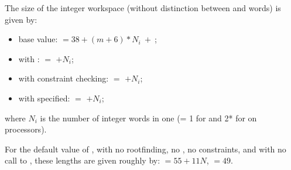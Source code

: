 {{  The size of the integer workspace (without distinction between 
  and  words) is given by:
  \begin{itemize}
  \item base value:  $= 38 + (m + 6)*N_i ~ + ~ $;
  \item with :  $=$  $+ N_i$;
  \item with constraint checking:  $=$  $+ N_i$;
  \item with  specified:  $=$  $+ N_i$;
  \end{itemize}
  where $N_i$ is the number of integer words in one 
  (= 1 for {\nvecs} and 2* for {\nvecp} on  processors).

  For the default value of , with no rootfinding, no ,
  no constraints, and with no call to , these lengths are
  given roughly by:  $= 55 + 11N$,  $= 49$.

}}
